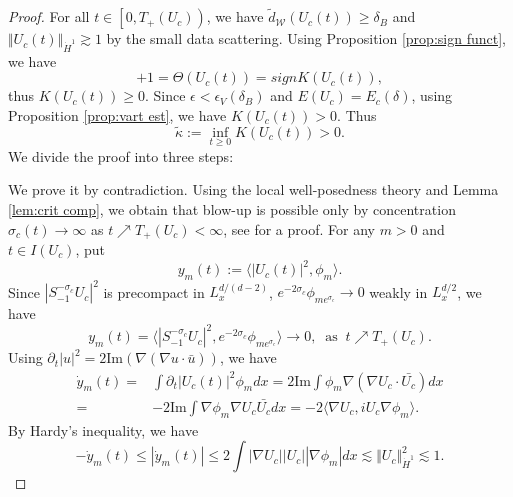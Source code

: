 \documentclass[reqno, 11pt]{amsart}
\numberwithin{equation}{section}
\theoremstyle{plain}
\theoremstyle{definition}
\numberwithin{equation}{section}
\numberwithin{theorem}{section}
\numberwithin{equation}{section}
\renewcommand{\Im}{\mathrm{Im}}
\numberwithin{equation}{section}
\numberwithin{theorem}{section}
\begin{document}
	\begin{proof}
		For all $t\in\left[0,T_+(U_c) \right)$, we have $\widetilde{d}_{\mathcal{W}}(U_c(t))\geq \delta_{B}$ and $\Vert U_c(t) \Vert_{\dot H^1}\gtrsim 1$ by the small data scattering. Using Proposition \ref{prop:sign funct}, we have 
		\begin{equation*}
		+1=\Theta(U_c(t))=signK(U_c(t)),
		\end{equation*}
		thus $K(U_c(t))\geq0$. Since $\epsilon<\epsilon_{V}(\delta_{B})$ and $E(U_c)=E_c(\delta)$, using Proposition \ref{prop:vart est}, we have $K(U_c(t))>0$. Thus
		\begin{equation*}
		\widetilde{\kappa}:=\inf_{t\geq 0}K(U_c(t))>0.
		\end{equation*}
		We divide the proof into three steps:
		
		 We prove it by contradiction. Using the local well-posedness theory and Lemma \ref{lem:crit comp}, we obtain that blow-up is possible only by concentration $\sigma_{c}(t)\to \infty$ as $t\nearrow T_+(U_c)<\infty$, see \cite{MXZ:crit Hart:f rad} for a proof. For any $m>0$ and $t\in I(U_c)$, put 
		\begin{equation*}
		y_m(t):=\langle |U_c(t)|^2,\phi_m \rangle.
		\end{equation*}
		Since $|S_{-1}^{-\sigma_{c}}U_c|^2$ is precompact in $L_{x}^{d/(d-2)}$, $e^{-2\sigma_{c}}\phi_{me^{\sigma_{c}}} \to 0$ weakly in $L_{x}^{d/2}$, we have
		\begin{equation*}
		y_m(t)=\langle |S_{-1}^{-\sigma_{c}}U_c|^2,e^{-2\sigma_{c}}\phi_{me^{\sigma_{c}}} \rangle \to 0,\;\;\text{as}\;\;t\nearrow T_+(U_c).
		\end{equation*}
		Using $\partial_{t}|u|^2=2\Im\left( \nabla\left(\nabla u\cdot \bar{u}\right) \right)$, we have
		\begin{equation*}
		\begin{aligned}
		\dot{y}_m (t)=&\int \partial_{t} |U_c(t)|^2\phi_m dx=2\Im\int \phi_m \nabla\left(\nabla U_c\cdot \bar{U_c}\right) dx\\=&-2\Im\int \nabla \phi_m\nabla U_c\bar{U_c} dx=-2\langle \nabla U_c,iU_c\nabla\phi_m \rangle.
		\end{aligned}
		\end{equation*}
		By Hardy's inequality, we have 
		\begin{equation*}
		-\dot{y}_m (t)\leq|\dot{y}_m (t)|\leq 2\int |\nabla U_c||U_c||\nabla \phi_m|dx\lesssim \Vert U_c \Vert_{\dot H^1}^2 \lesssim1.
		\end{equation*}

\end{proof}
\end{document}
